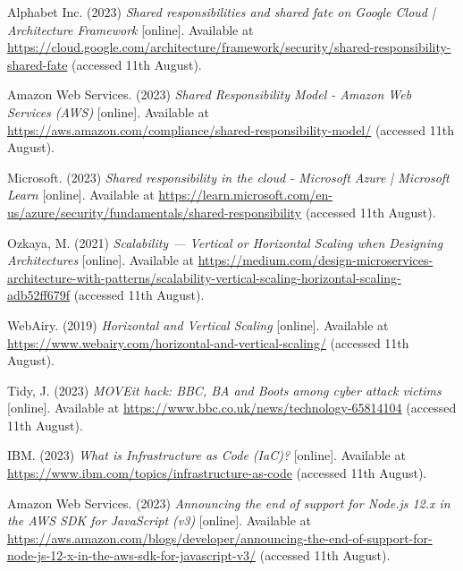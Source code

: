  \noindent [9] Alphabet Inc. (2023) \textit{Shared responsibilities and shared fate on Google Cloud | Architecture Framework} [online]. Available at \url{https://cloud.google.com/architecture/framework/security/shared-responsibility-shared-fate} (accessed 11th August).
 \vspace{0.2cm}

 \noindent [10] Amazon Web Services. (2023) \textit{Shared Responsibility Model - Amazon Web Services (AWS)} [online]. Available at \url{https://aws.amazon.com/compliance/shared-responsibility-model/} (accessed 11th August).
 \vspace{0.2cm}

 \noindent [11] Microsoft. (2023) \textit{Shared responsibility in the cloud - Microsoft Azure | Microsoft Learn} [online]. Available at \url{https://learn.microsoft.com/en-us/azure/security/fundamentals/shared-responsibility} (accessed 11th August).
 \vspace{0.2cm}

 \noindent [12] Ozkaya, M. (2021) \textit{Scalability — Vertical or Horizontal Scaling when Designing Architectures} [online]. Available at \url{https://medium.com/design-microservices-architecture-with-patterns/scalability-vertical-scaling-horizontal-scaling-adb52ff679f} (accessed 11th August).
 \vspace{0.2cm}

 \noindent [13] WebAiry. (2019) \textit{Horizontal and Vertical Scaling} [online]. Available at \url{https://www.webairy.com/horizontal-and-vertical-scaling/} (accessed 11th August).
 \vspace{0.2cm}

 \noindent [14] Tidy, J. (2023) \textit{MOVEit hack: BBC, BA and Boots among cyber attack victims} [online]. Available at \url{https://www.bbc.co.uk/news/technology-65814104} (accessed 11th August).
 \vspace{0.2cm}

 \noindent [15] IBM. (2023) \textit{What is Infrastructure as Code (IaC)?} [online]. Available at \url{https://www.ibm.com/topics/infrastructure-as-code} (accessed 11th August).
 \vspace{0.2cm}

 \noindent [16] Amazon Web Services. (2023) \textit{Announcing the end of support for Node.js 12.x in the AWS SDK for JavaScript (v3)} [online]. Available at \url{https://aws.amazon.com/blogs/developer/announcing-the-end-of-support-for-node-js-12-x-in-the-aws-sdk-for-javascript-v3/} (accessed 11th August).
 \vspace{0.2cm}

